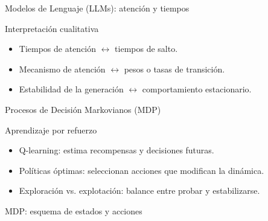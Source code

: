\documentclass[aspectratio=169]{beamer}
\theoremstyle{plain}
\theoremstyle{definition}
\newcommand{\1}{\mathbf{1}}
\begin{document}
\begin{frame}[t]{Modelos de Lenguaje (LLMs): atención y tiempos}
  \begin{block}{Interpretación cualitativa}
    \begin{itemize}
      \item Tiempos de atención $\leftrightarrow$ tiempos de salto.
      \item Mecanismo de atención $\leftrightarrow$ pesos o tasas de transición.
      \item Estabilidad de la generación $\leftrightarrow$ comportamiento estacionario.
    \end{itemize}
  \end{block}

  \begin{center}
  \end{center}
\end{frame}

\begin{frame}[t]{Procesos de Decisión Markovianos (MDP)}
  \begin{block}{Aprendizaje por refuerzo}
    \begin{itemize}
      \item Q-learning: estima recompensas y decisiones futuras.
      \item Políticas óptimas: seleccionan acciones que modifican la dinámica.
      \item Exploración vs. explotación: balance entre probar y estabilizarse.
    \end{itemize}
  \end{block}
\end{frame}

\begin{frame}[t]{MDP: esquema de estados y acciones}
  \begin{center}
  \end{center}
\end{frame}
\end{document}
